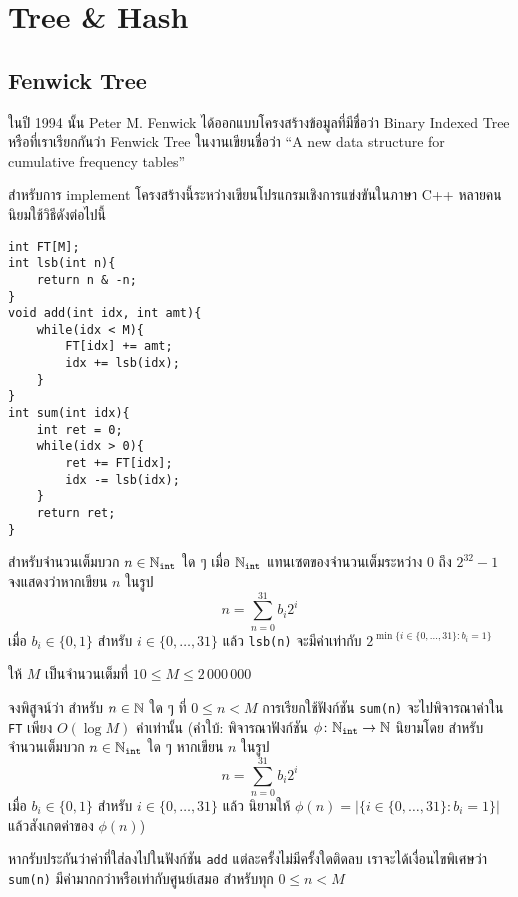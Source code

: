 \chapter{Tree \& Hash}

\section{Fenwick Tree}

ในปี 1994 นั้น Peter M. Fenwick ได้ออกแบบโครงสร้างข้อมูลที่มีชื่อว่า Binary Indexed Tree หรือที่เราเรียกกันว่า Fenwick Tree ในงานเขียนชื่อว่า ``A new data structure for cumulative frequency tables''

สำหรับการ implement โครงสร้างนี้ระหว่างเขียนโปรแกรมเชิงการแข่งขันในภาษา C++ หลายคนนิยมใช้วิธีดังต่อไปนี้

\begin{lstlisting}
int FT[M];
int lsb(int n){
    return n & -n;
}
void add(int idx, int amt){
    while(idx < M){
        FT[idx] += amt;
        idx += lsb(idx);
    }
}
int sum(int idx){
    int ret = 0;
    while(idx > 0){
        ret += FT[idx];
        idx -= lsb(idx);
    }
    return ret;
}
\end{lstlisting}

\begin{exercise}
สำหรับจำนวนเต็มบวก $n \in \mathbb{N}_{\texttt{int}}$ ใด ๆ เมื่อ $\mathbb{N}_{\texttt{int}}$ แทนเซตของจำนวนเต็มระหว่าง $0$ ถึง $2^{32}-1$ จงแสดงว่าหากเขียน $n$ ในรูป
\[
n = \sum_{n=0}^{31} b_i 2^i
\]
เมื่อ $b_i \in \{0, 1\}$ สำหรับ $i \in \{0, \dots, 31\}$ แล้ว \texttt{lsb(n)} จะมีค่าเท่ากับ $2^{\min\{i \in \{0, \dots, 31\} \colon b_i = 1\}}$
\end{exercise}

ให้ $M$ เป็นจำนวนเต็มที่ $10 \leq M \leq 2\,000\,000$

\begin{exercise}
จงพิสูจน์ว่า สำหรับ $n \in \mathbb{N}$ ใด ๆ ที่ $0 \leq n < M$ การเรียกใช้ฟังก์ชัน \texttt{sum(n)} จะไปพิจารณาค่าใน \texttt{FT} เพียง $O(\log M)$ ค่าเท่านั้น (คำใบ้: พิจารณาฟังก์ชัน $\phi \colon \mathbb{N}_{\texttt{int}} \to \mathbb{N}$ นิยามโดย สำหรับจำนวนเต็มบวก $n \in \mathbb{N}_{\texttt{int}}$ ใด ๆ หากเขียน $n$ ในรูป
\[
n = \sum_{n=0}^{31} b_i 2^i
\]
เมื่อ $b_i \in \{0, 1\}$ สำหรับ $i \in \{0, \dots, 31\}$ แล้ว นิยามให้ $\phi(n) = |\{i \in \{0, \dots, 31\} \colon b_i = 1\}|$ แล้วสังเกตค่าของ $\phi(n)$)
\end{exercise}

หากรับประกันว่าค่าที่ใส่ลงไปในฟังก์ชัน \texttt{add} แต่ละครั้งไม่มีครั้งใดติดลบ เราจะได้เงื่อนไขพิเศษว่า \texttt{sum(n)} มีค่ามากกว่าหรือเท่ากับศูนย์เสมอ สำหรับทุก $0 \leq n < M$

